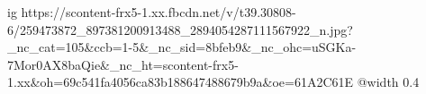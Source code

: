  
 
 
 
 

\ifcmt
  ig https://scontent-frx5-1.xx.fbcdn.net/v/t39.30808-6/259473872_897381200913488_2894054287111567922_n.jpg?_nc_cat=105&ccb=1-5&_nc_sid=8bfeb9&_nc_ohc=uSGKa-7Mor0AX8baQie&_nc_ht=scontent-frx5-1.xx&oh=69c541fa4056ca83b188647488679b9a&oe=61A2C61E
  @width 0.4
\fi

